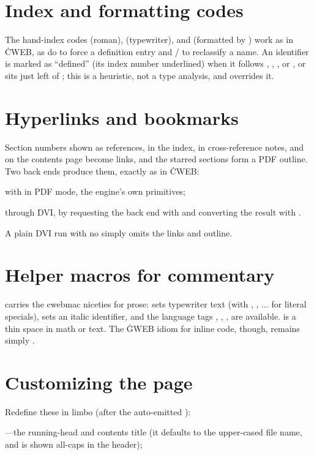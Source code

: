 \section{Index and formatting codes}
The hand-index codes  (roman),  (typewriter),
and  (formatted by ) work as in \.{CWEB}, as do  to
force a definition entry and / to reclassify a name. An identifier
is marked as ``defined'' (its index number underlined) when it follows ,
, , or , or sits just left of \cw{:=}; this is a
heuristic, not a type analysis, and  overrides it.

\section{Hyperlinks and bookmarks}
Section numbers shown as references, in the index, in cross-reference notes, and
on the contents page become links, and the starred sections form a PDF outline.
Two back ends produce them, exactly as in \.{CWEB}:

\bull with  in PDF mode, the engine's own primitives;

\bull through DVI, by requesting the  back end with
 and converting the result with .

\noindent A plain DVI run with no  simply omits the links and outline.

\section{Helper macros for commentary}
 carries the cwebmac niceties for prose: 
sets typewriter text (with \cw{\bs\bs}, , $\ldots$ for literal
specials),  sets an italic identifier, and the
language tags , , ,  are
available. \cw{\bs,} is a thin space in math or text. The \.{GWEB} idiom for inline
code, though, remains simply .

\section{Customizing the page}
Redefine these in limbo (after the auto-emitted ):

\bull {}---the running-head and contents
title (it defaults to the upper-cased file name, and is shown all-caps in the
header);

